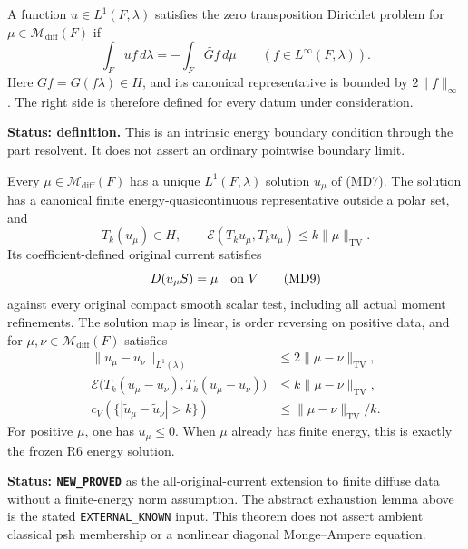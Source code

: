 \begin{definition}
\label{def:r11-transposition-boundary}
A function $u\in L^1(F,\lambda)$ satisfies the zero transposition
Dirichlet problem for $\mu\in\mathcal M_{\mathrm{diff}}(F)$ if
\[
             \int_Fu f\,d\lambda
                   =-\int_F\widetilde{Gf}\,d\mu
                        \qquad(f\in L^\infty(F,\lambda)).
 \tag{MD7}
\]
Here $Gf=G(f\lambda)\in H$, and its canonical representative is
bounded by $2\|f\|_\infty$.  The right side is therefore defined
for every datum under consideration.
\end{definition}

\noindent\textbf{Status: definition.}
This is an intrinsic energy boundary condition through the
part resolvent.  It does not assert an ordinary pointwise
boundary limit.

\begin{theorem}
\label{thm:r11-diffuse-transposition-dirichlet}
Every $\mu\in\mathcal M_{\mathrm{diff}}(F)$ has a unique
$L^1(F,\lambda)$ solution $u_\mu$ of (MD7).  The solution has
a canonical finite energy-quasicontinuous representative
outside a polar set, and
\[
       T_k(u_\mu)\in H,\qquad
       \mathcal E(T_ku_\mu,T_ku_\mu)\leq k\|\mu\|_{\mathrm{TV}}.
 \tag{MD8}
\]
Its coefficient-defined original current satisfies
\[
                         D(u_\mu S)=\mu\quad\hbox{on }V
 \tag{MD9}
\]
against every original compact smooth scalar test, including
all actual moment refinements.
The solution map is linear, is order reversing on positive data,
and for $\mu,\nu\in\mathcal M_{\mathrm{diff}}(F)$ satisfies
\[
 \begin{split}
 \|u_\mu-u_\nu\|_{L^1(\lambda)}
                   &\leq2\|\mu-\nu\|_{\mathrm{TV}},\\
 \mathcal E\bigl(T_k(u_\mu-u_\nu),T_k(u_\mu-u_\nu)\bigr)
                   &\leq k\|\mu-\nu\|_{\mathrm{TV}},\\
 c_V(\{|\widetilde u_\mu-\widetilde u_\nu|>k\})
                   &\leq\|\mu-\nu\|_{\mathrm{TV}}/k.
 \end{split}
 \tag{MD10}
\]
For positive $\mu$, one has $u_\mu\leq0$.
When $\mu$ already has finite energy, this is exactly the
frozen R6 energy solution.
\end{theorem}

\noindent\textbf{Status: \texttt{NEW\_PROVED}} as the
all-original-current extension to finite diffuse data without a
finite-energy norm assumption.  The abstract exhaustion lemma
above is the stated \texttt{EXTERNAL\_KNOWN} input.
This theorem does not assert ambient classical psh membership
or a nonlinear diagonal Monge--Ampere equation.

